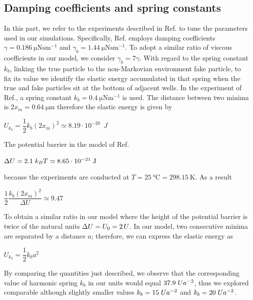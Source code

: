 \subsection{Damping coefficients and spring constants}
In this part, we refer to the experiments described in Ref.\cite{ginot2022} to tune the parameters used in our simulations. Specifically, Ref.\cite{ginot2022} employs damping coefficients $\gamma =\SI{0.186}{\micro\newton\second\meter^{-1}}$ and $\gamma_b = \SI{1.44}{\micro\newton\second\meter^{-1}}$. To adopt a similar ratio of viscous coefficients in our model, we consider  $\gamma_b = 7 \gamma$. With regard to the spring constant $k_b$, linking the true particle to the non-Markovian environment fake particle, to fix its value we identify the elastic energy accumulated in that spring when the true and fake particles sit at the bottom of adjacent wells. In the experiment of Ref.\cite{ginot2022}, a spring constant $k_b=\SI{0.4}{\micro\newton\meter^{-1}}$ is used. The distance between two minima is $2x_m =\SI{0.64}{\micro\meter}$ therefore the elastic energy is given by 
\begin{center}
    $U_{k_b} = \dfrac{1}{2}k_b (2 x_m)^2 \simeq 8.19 \cdot 10^{-20} \;\SI{}{J}$
\end{center}
The potential barrier in the model of Ref.\cite{ginot2022} 
\begin{center}
    $\Delta U = 2.1\hspace{0.1cm} k_BT \simeq 8.65 \cdot 10^{-21}\;\SI{}{\joule}$
\end{center}
because the experiments are conducted at $T=\SI{25}{\degreeCelsius}=\SI{298.15}{\kelvin}$. As a result 
\begin{center}
    $\dfrac{1}{2}\dfrac{k_b (2 x_m)^2}{\Delta U} \simeq 9.47$
\end{center}
To obtain a similar ratio in our model where the height of the potential barrier is twice of the natural units $\Delta U = U_0 = 2\hspace{0.05cm}U$. In our model, two consecutive minima are separated by a distance $a$; therefore, we can express the elastic energy as
\begin{center}
    $U_{k_b}  = \dfrac{1}{2}k_b a^2$
\end{center}
By comparing the quantities just described, we observe that the corresponding value of harmonic spring $k_b$ in our units would equal $37.9 \hspace{0.1cm} Ua^{-2}$, thus we explored comparable although slightly smaller values $k_b= 15 \hspace{0.1cm} Ua^{-2}$ and $k_b= 20 \hspace{0.1cm} Ua^{-2}$.

